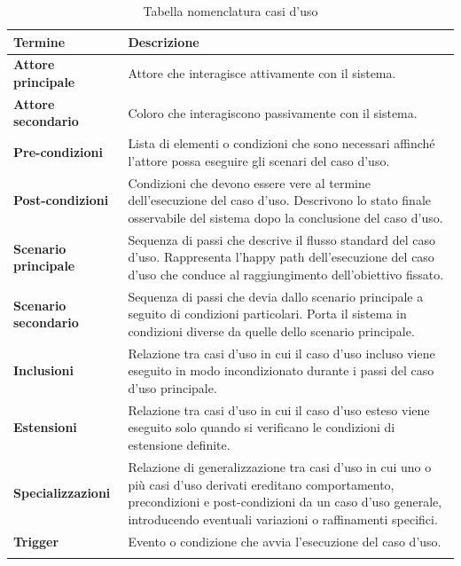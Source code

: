 \documentclass[a4paper,12pt]{article}
\begin{document}
\begin{center}
\small
{} 
\begin{longtable}{|p{}|p{}|}

\hline
\rowcolor{gray!60}
{\centering \textbf{Termine}\par} &
{\centering \textbf{Descrizione}\par} \\
\hline
\rowcolor{white}
\centering \textbf{Attore principale} & Attore che interagisce attivamente con il sistema. \\
\hline
\rowcolor{gray!20}
\centering \textbf{Attore secondario} & Coloro che interagiscono passivamente con il sistema. \\
\hline
\rowcolor{white}
\centering \textbf{Pre-condizioni} & Lista di elementi o condizioni che sono necessari affinché l'attore possa eseguire gli scenari del caso d'uso. \\
\hline
\rowcolor{gray!20}
\centering \textbf{Post-condizioni} & Condizioni che devono essere vere al termine dell'esecuzione del caso d'uso. Descrivono lo stato finale osservabile del sistema dopo la conclusione del caso d'uso.  \\
\hline
\rowcolor{white}
\centering \textbf{Scenario principale} & Sequenza di passi che descrive il flusso standard del caso d'uso. Rappresenta l'happy path dell'esecuzione del caso d'uso che conduce al raggiungimento dell'obiettivo fissato. \\
\hline
\rowcolor{gray!20}
\centering \textbf{Scenario secondario} & Sequenza di passi che devia dallo scenario principale a seguito di condizioni particolari. Porta il sistema in condizioni diverse da quelle dello scenario principale. \\
\hline
\rowcolor{white}
\centering \textbf{Inclusioni} & Relazione tra casi d'uso in cui il caso d'uso incluso viene eseguito in modo incondizionato durante i passi del caso d'uso principale. \\
\hline
\rowcolor{gray!20}
\centering \textbf{Estensioni} & Relazione tra casi d'uso in cui il caso d'uso esteso viene eseguito solo quando si verificano le condizioni di estensione definite. \\
\hline
\rowcolor{white}
\centering \textbf{Specializzazioni} & Relazione di generalizzazione tra casi d'uso in cui uno o più casi d'uso derivati ereditano comportamento, precondizioni e post-condizioni da un caso d'uso generale, introducendo eventuali variazioni o raffinamenti specifici. \\
\hline
\rowcolor{gray!20}
\centering \textbf{Trigger} & Evento o condizione che avvia l'esecuzione del caso d'uso. \\
\hline

\caption{Tabella nomenclatura casi d'uso} \label{tab:nomenclatura} \\

\end{longtable}
\end{center}
\end{document}
